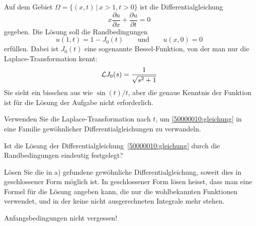 Auf dem Gebiet $\Omega=\{(x,t)\,|\, x>1,t > 0\}$
ist die Differentialgleichung
\begin{equation}
x\frac{\partial u}{\partial x}+\frac{\partial u}{\partial t}=0
\label{50000010:gleichung}
\end{equation}
gegeben. Die Lösung soll die Randbedingungen
\[
u(1,t)=1-J_0(t)
\qquad
\text{und}
\qquad
u(x,0)=0
\]
erfüllen.
Dabei ist $J_0(t)$ eine sogenannte Bessel-Funktion, von der man nur
die Laplace-Transformation kennt:
\[
{\cal L}J_0(s)=\frac1{\sqrt{s^2+1}}
\]
Sie sieht ein bisschen aus wie $\sin(t)/t$, aber die genaue Kenntnis der
Funktion ist für die Lösung der Aufgabe nicht erforderlich.
\begin{teilaufgaben}
\item Verwenden Sie die Laplace-Transformation nach $t$,
um \eqref{50000010:gleichung} in eine Familie gewöhnlicher
Differentialgleichungen zu verwandeln.
\item 
Ist die Lösung der Differentialgleichung~\eqref{50000010:gleichung} durch
die Randbedingungen eindeutig festgelegt?
\item
Lösen Sie die in a) gefundene gewöhnliche Differentialgleichung,
soweit dies in geschlossener Form möglich ist.
In geschlossener Form
lösen heisst, dass man eine Formel für die Lösung angeben kann, die 
nur die wohlbekannten Funktionen verwendet, und in der keine nicht
ausgerechneten Integrale mehr stehen.
\end{teilaufgaben}

\begin{hinweis}
Anfangsbedingungen nicht vergessen!
\end{hinweis}

